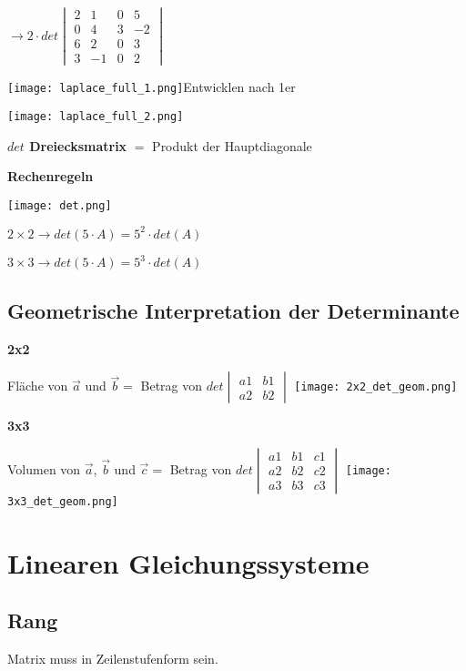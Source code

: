 \begin{multicols*}{3}
{\begin{multicols}{2}
            {  $ \rightarrow  2 \cdot det \begin{vmatrix} 2 & 1 & 0 & 5 \\ 0 & 4 & 3 & -2 \\ 6 & 2 &0 & 3 \\ 3 & -1 &0 & 2 \end{vmatrix} $}
        \end{multicols}}

    {\texttt{[image: laplace\_full\_1.png]}Entwicklen nach 1er}

    {\texttt{[image: laplace\_full\_2.png]}}


    \textbf{$det$ Dreiecksmatrix}
    $ = $ Produkt der Hauptdiagonale
    \WhiteSpace

    \textbf{Rechenregeln}

    {\texttt{[image: det.png]}}

    $2\times 2 \rightarrow det(5 \cdot A) = 5^2 \cdot det(A)$

    $3\times 3 \rightarrow det(5 \cdot A) = 5^3 \cdot det(A)$

    \WhiteSpace
    \subsection{Geometrische Interpretation der Determinante }
    {\textbf{2x2}}

    {Fläche von $\vec{a} $ und $ \vec{b} = $ Betrag von $ det \begin{vmatrix} a1 & b1  \\ a2 & b2 \end{vmatrix} $}
    {\texttt{[image: 2x2\_det\_geom.png]}}




    \textbf{3x3}

    {Volumen von $\vec{a} $, $ \vec{b}$ und $\vec{c} = $ Betrag von $   det \begin{vmatrix} a1 & b1 & c1 \\ a2 & b2 & c2 \\ a3 & b3 & c3  \end{vmatrix}  $}
    {\texttt{[image: 3x3\_det\_geom.png]}}
    \mbox{}


    \section{Linearen Gleichungssysteme}
    \subsection{Rang}
    {Matrix muss in Zeilenstufenform sein.}


\end{multicols*}
